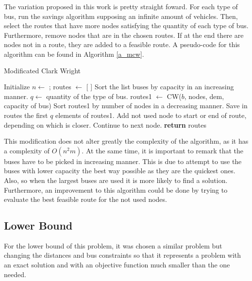 \documentclass[10pt,twoside]{article}
\begin{document}
The variation proposed in this work is pretty straight foward. For
each type of bus, run the savings algorithm supposing an infinite
amount of vehicles. Then, select the routes that have more nodes
satisfying the quantity of each type of bus. Furthermore, remove nodes
that are in the chosen routes. If at the end there are nodes not in a
route, they are added to a feasible route. A pseudo-code for this
algorithm can be found in Algorithm \ref{a_mcw}.

\begin{algorithm}[H]
\caption{Modificated Clark Wright}\label{a_mcw}
\begin{algorithmic}[1]
  \State Initialize $n \gets $ ; routes $\gets$ [ ]
  \State Sort the list buses by capacity in an increasing manner.
    \State $q \gets$ quantity of the type of bus.
    \State routes1 $\gets$ CW($b$, nodes, dem, capacity of bus)
    \State Sort routes1 by number of nodes in a decreasing manner.
    \State Save in routes the first $q$ elements of routes1.
  \EndFor
        \State Add not used node to start or end of route, depending on which is closer.
        \State Continue to next node.
      \EndIf
    \EndFor
  \EndFor
   \State \textbf{return} routes
\EndProcedure
\end{algorithmic}
\end{algorithm}

This modification does not alter greatly the complexity of the
algorithm, as it has a complexity of $O(n^2m)$. At the same time, it
is important to remark that the buses have to be picked in increasing
manner. This is due to attempt to use the buses with lower capacity
the best way possible as they are the quickest ones. Also, so when the
largest buses are used it is more likely to find a
solution. Furthermore, an improvement to this algorithm could be done
by trying to evaluate the best feasible route for the not used nodes.

\subsection{Lower Bound}\label{sec_lb}
For the lower bound of this problem, it was chosen a similar problem
but changing the distances and bus constraints so that it represents a
problem with an exact solution and with an objective function much
smaller than the one needed.
\end{document}
